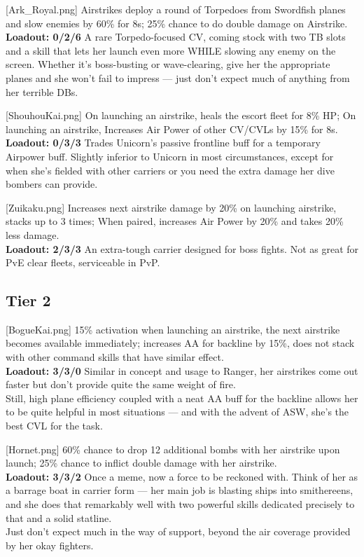 [Ark_Royal.png]
{Airstrikes deploy a round of Torpedoes from Swordfish planes and slow enemies by 60\% for 8s; 25\% chance to do double damage on Airstrike.\\
\textbf{Loadout: 0/2/6}}
{}
{A rare Torpedo-focused CV, coming stock with two TB slots and a skill that lets her launch even more WHILE slowing any enemy on the screen. Whether it's boss-busting or wave-clearing, give her the appropriate planes and she won't fail to impress --- just don't expect much of anything from her terrible DBs.}

[ShouhouKai.png]
{On launching an airstrike, heals the escort fleet for 8\% HP; On launching an airstrike, Increases Air Power of other CV/CVLs by 15\% for 8s.\\
\textbf{Loadout: 0/3/3}}
{}
{Trades Unicorn's passive frontline buff for a temporary Airpower buff. Slightly inferior to Unicorn in most circumstances, except for when she's fielded with other carriers or you need the extra damage her dive bombers can provide.}
 
[Zuikaku.png]
{Increases next airstrike damage by 20\% on launching airstrike, stacks up to 3 times; When paired, increases Air Power by 20\% and takes 20\% less damage.\\
\textbf{Loadout: 2/3/3}}
{}
{An extra-tough carrier designed for boss fights. Not as great for PvE clear fleets, serviceable in PvP.}

 
\newpage
\subsection{Tier 2}
[BogueKai.png]
{15\% activation when launching an airstrike, the next airstrike becomes available immediately; increases AA for backline by 15\%, does not stack with other command skills that have similar effect.\\
\textbf{Loadout: 3/3/0}}
{}
{Similar in concept and usage to Ranger, her airstrikes come out faster but don't provide quite the same weight of fire.\\
Still, high plane efficiency coupled with a neat AA buff for the backline allows her to be quite helpful in most situations --- and with the advent of ASW, she's the best CVL for the task.}
 
[Hornet.png]
{60\% chance to drop 12 additional bombs with her airstrike upon launch; 25\% chance to inflict double damage with her airstrike.\\
\textbf{Loadout: 3/3/2}}
{}
{Once a meme, now a force to be reckoned with. Think of her as a barrage boat in carrier form --- her main job is blasting ships into smithereens, and she does that remarkably well with two powerful skills dedicated precisely to that and a solid statline.\\
Just don't expect much in the way of support, beyond the air coverage provided by her okay fighters.}

